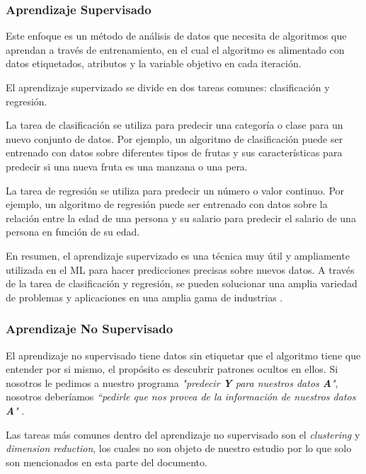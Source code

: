 \subsubsection{Aprendizaje Supervisado}
Este enfoque es un método de análisis de datos que necesita de algoritmos que aprendan a través de entrenamiento, en el cual el algoritmo es alimentado con datos etiquetados, atributos y la variable objetivo en cada iteración.\\
\par El aprendizaje supervizado se divide en dos tareas comunes: clasificación y regresión.\\
\par La tarea de clasificación se utiliza para predecir una categoría o clase para un nuevo conjunto de datos. Por ejemplo, un algoritmo de clasificación puede ser entrenado con datos sobre diferentes tipos de frutas y sus características para predecir si una nueva fruta es una manzana o una pera.\\
\par La tarea de regresión se utiliza para predecir un número o valor continuo. Por ejemplo, un algoritmo de regresión puede ser entrenado con datos sobre la relación entre la edad de una persona y su salario para predecir el salario de una persona en función de su edad.\\
\par En resumen, el aprendizaje supervizado es una técnica muy útil y ampliamente utilizada en el ML para hacer predicciones precisas sobre nuevos datos. A través de la tarea de clasificación y regresión, se pueden solucionar una amplia variedad de problemas y aplicaciones en una amplia gama de industrias \cite{murdoch2019interpretable}. \\


\doublespacing
\subsubsection{Aprendizaje No Supervisado}
El aprendizaje no supervisado tiene datos sin etiquetar que el algoritmo tiene que entender por si mismo, el propósito es descubrir patrones ocultos en ellos. Si nosotros le pedimos a nuestro programa \textit{"predecir \textbf{Y} para nuestros datos \textbf{A}"},  nosotros deberíamos \textit{“pedirle que nos provea de la información de nuestros datos \textbf{A}"} \cite{murdoch2019interpretable}.\\
\par Las tareas más comunes dentro del aprendizaje no supervisado son el \emph{clustering} y \emph{dimension reduction}, los cuales no son objeto de nuestro estudio por lo que solo son mencionados en esta parte del documento.\\


